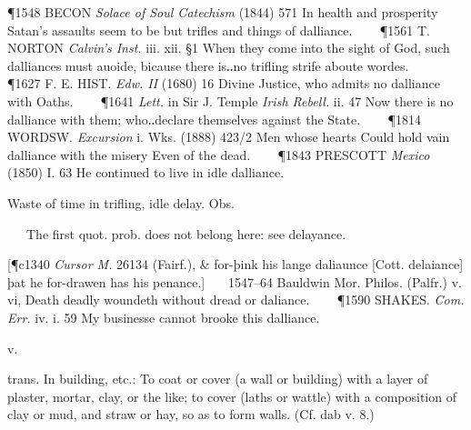 \begin{description}[wide, labelwidth=!, labelindent=0pt]
\begin{myenumerate}
\P 1548 BECON  \textit{Solace of Soul Catechism} (1844) 571 In health and prosperity Satan's assaults seem to be but trifles and things of dalliance.    
\P 1561 T. NORTON  \textit{Calvin's Inst.} iii. xii. §1 When they come into the sight of God, such dalliances must auoide, bicause there is‥no trifling strife aboute wordes.    
\P 1627 F. E. HIST.  \textit{Edw. II} (1680) 16 Divine Justice, who admits no dalliance with Oaths.    
\P 1641 \textit{Lett.} in  Sir J. Temple \textit{Irish Rebell.} ii. 47 Now there is no dalliance with them; who‥declare themselves against the State.    
\P 1814 WORDSW.  \textit{Excursion} i. Wks. (1888) 423/2 Men whose hearts Could hold vain dalliance with the misery Even of the dead.    
\P 1843 PRESCOTT  \textit{Mexico} (1850) I. 63 He continued to live in idle dalliance.

 Waste of time in trifling, idle delay. Obs.

   The first quot. prob. does not belong here: see delayance.

[\P c1340  \textit{Cursor M.} 26134 (Fairf.), \& for-þink his lange daliaunce [Cott. delaiance] þat he for-drawen has his penance.]    1547–64 Bauldwin Mor. Philos. (Palfr.) v. vi, Death deadly woundeth without dread or daliance.    
\P 1590 SHAKES.  \textit{Com. Err.} iv. i. 59 My businesse cannot brooke this dalliance.
\end{myenumerate}


 v.

\noindent {}

\vspace{-0.3cm}

\begin{myenumerate}

 trans. In building, etc.: To coat or cover (a wall or building) with a layer of plaster, mortar, clay, or the like; to cover (laths or wattle) with a composition of clay or mud, and straw or hay, so as to form walls. (Cf. dab v. 8.)


\end{myenumerate}
\end{description}
